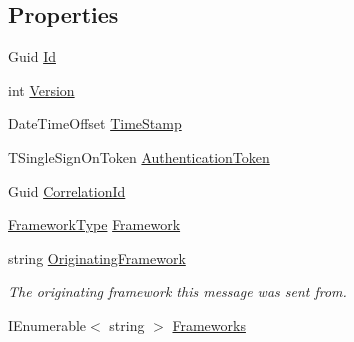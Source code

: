 \subsection*{Properties}
\begin{DoxyCompactItemize}
\item 
Guid \hyperlink{classCqrs_1_1WebApi_1_1HelpPageConfig_1_1UserCreatedEvent_a954a41a7026b78fbb455ba20ff1e055b}{Id}
\item 
int \hyperlink{classCqrs_1_1WebApi_1_1HelpPageConfig_1_1UserCreatedEvent_a944701cbbb3eb260c43058d5f6dd5995}{Version}
\item 
Date\+Time\+Offset \hyperlink{classCqrs_1_1WebApi_1_1HelpPageConfig_1_1UserCreatedEvent_aabf0ce7b7e8956966e02553d0e93e537}{Time\+Stamp}
\item 
T\+Single\+Sign\+On\+Token \hyperlink{classCqrs_1_1WebApi_1_1HelpPageConfig_1_1UserCreatedEvent_aa8d10ff30ee35f23533da85c0dac8d88}{Authentication\+Token}
\item 
Guid \hyperlink{classCqrs_1_1WebApi_1_1HelpPageConfig_1_1UserCreatedEvent_ae9d6022467b17819740c0c69f7a749bf}{Correlation\+Id}
\item 
\hyperlink{namespaceCqrs_1_1Messages_af06a7e6cd2609043d0f2f5f3419f81e3}{Framework\+Type} \hyperlink{classCqrs_1_1WebApi_1_1HelpPageConfig_1_1UserCreatedEvent_afaf98b2dbd5a99958b769f154b7f4638}{Framework}
\item 
string \hyperlink{classCqrs_1_1WebApi_1_1HelpPageConfig_1_1UserCreatedEvent_a99344449aa7d37839eac84dbea4fe27e}{Originating\+Framework}
\begin{DoxyCompactList}\small\item\em The originating framework this message was sent from. \end{DoxyCompactList}\item 
I\+Enumerable$<$ string $>$ \hyperlink{classCqrs_1_1WebApi_1_1HelpPageConfig_1_1UserCreatedEvent_a6a5b798621c76be8474b1189ed1c9608}{Frameworks}

\end{DoxyCompactItemize}

